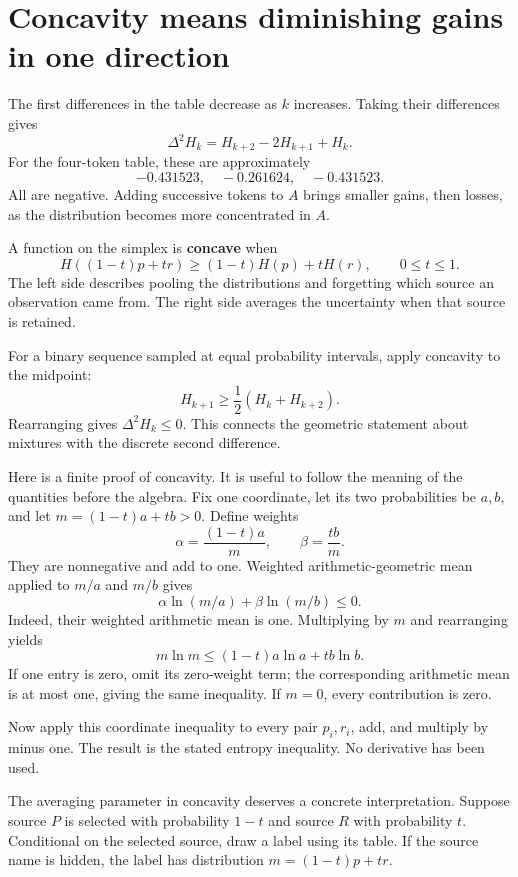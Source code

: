 \documentclass[11pt,oneside,openany]{book}
\theoremstyle{definition}
\theoremstyle{remark}
\numberwithin{equation}{chapter}
\begin{document}
\section{Concavity means diminishing gains in one direction}\label{ch05-concavity-means-diminishing-gains-in-one-direction}

The first differences in the table decrease as \(k\) increases. Taking their differences gives \[\Delta^2H_k=H_{k+2}-2H_{k+1}+H_k.\] For the four-token table, these are approximately \[-0.431523,\quad-0.261624,\quad-0.431523.\] All are negative. Adding successive tokens to \(A\) brings smaller gains, then losses, as the distribution becomes more concentrated in \(A\).

A function on the simplex is \textbf{concave} when \[H((1-t)p+tr)\geq(1-t)H(p)+tH(r),
\qquad 0\leq t\leq1.\] The left side describes pooling the distributions and forgetting which source an observation came from. The right side averages the uncertainty when that source is retained.

For a binary sequence sampled at equal probability intervals, apply concavity to the midpoint: \[H_{k+1}\geq\frac12(H_k+H_{k+2}).\] Rearranging gives \(\Delta^2H_k\leq0\). This connects the geometric statement about mixtures with the discrete second difference.

Here is a finite proof of concavity. It is useful to follow the meaning of the quantities before the algebra. Fix one coordinate, let its two probabilities be \(a,b\), and let \(m=(1-t)a+tb>0\). Define weights \[\alpha=\frac{(1-t)a}{m},\qquad \beta=\frac{tb}{m}.\] They are nonnegative and add to one. Weighted arithmetic-geometric mean applied to \(m/a\) and \(m/b\) gives \[\alpha\ln(m/a)+\beta\ln(m/b)\leq0.\] Indeed, their weighted arithmetic mean is one. Multiplying by \(m\) and rearranging yields \[m\ln m\leq(1-t)a\ln a+tb\ln b.\] If one entry is zero, omit its zero-weight term; the corresponding arithmetic mean is at most one, giving the same inequality. If \(m=0\), every contribution is zero.

Now apply this coordinate inequality to every pair \(p_i,r_i\), add, and multiply by minus one. The result is the stated entropy inequality. No derivative has been used.

The averaging parameter in concavity deserves a concrete interpretation. Suppose source \(P\) is selected with probability \(1-t\) and source \(R\) with probability \(t\). Conditional on the selected source, draw a label using its table. If the source name is hidden, the label has distribution \(m=(1-t)p+tr\).
\end{document}
